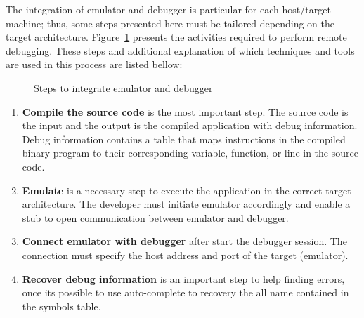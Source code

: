 \documentclass[conference]{IEEEtran}
\newcommand{\fig}[4][thb]{
  \begin{figure}[#1] {\centering{\texttt{[image: fig/\#2]}}\par}
    \captionsetup{font=small}
    \caption{#3\label{fig:#2}}
  \end{figure}
}
\begin{document}

The integration of emulator and debugger is particular for each host/target machine; thus, some steps presented here must be tailored depending on the target architecture. Figure~\ref{fig:emulator_debugger_gray} presents the activities required to perform remote debugging. These steps and additional explanation of which techniques and tools are used in this process are listed bellow:

\fig{emulator_debugger_gray}{Steps to integrate emulator and debugger}{scale=.25}

\begin{enumerate}
\item \textbf{Compile the source code} is the most important step. The source code is the input and the output is the compiled application with debug information. Debug information contains a table that maps instructions in the compiled binary program to their corresponding variable, function, or line in the source code. %

\item \textbf{Emulate %
} is a necessary step to execute the application in the correct target architecture. The developer must initiate emulator accordingly and enable a stub to open communication between emulator and debugger.%

\item \textbf{Connect emulator with debugger} after start the debugger session. The connection must specify the host address and port of the target (emulator).

\item \textbf{Recover debug information} is an important step to help finding errors, once its possible to use auto-complete to recovery the all name contained in the symbols table. %

\end{enumerate}
\end{document}

